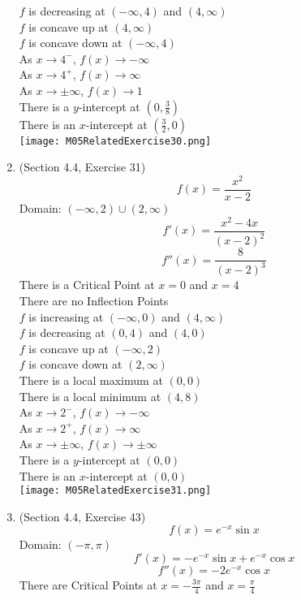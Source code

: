 \documentclass{article}
\begin{document}
\begin{enumerate}
        $f$ is decreasing at $(-\infty, 4)$ and $(4, \infty)$ \\
        $f$ is concave up at $(4, \infty)$ \\
        $f$ is concave down at $(-\infty, 4)$ \\
        As $x \to 4^-$, $f(x) \to -\infty$ \\
        As $x \to 4^+$, $f(x) \to \infty$ \\
        As $x \to \pm \infty$, $f(x) \to 1$ \\
        There is a $y$-intercept at $\left(0, \frac{3}{8}\right)$ \\
        There is an $x$-intercept at $\left(\frac{3}{2}, 0\right)$ \\
        \texttt{[image: M05RelatedExercise30.png]}
    \item (Section 4.4, Exercise 31)
        $$f(x) = \frac{x^2}{x - 2}$$
        Domain: $(-\infty, 2)\cup(2, \infty)$
        $$f'(x) = \frac{x^2 - 4x}{\left(x - 2\right)^2}$$
        $$f''(x) = \frac{8}{\left(x-2\right)^{3}}$$
        There is a Critical Point at $x = 0$ and $x = 4$ \\
        There are no Inflection Points \\
        $f$ is increasing at $(-\infty, 0)$ and $(4, \infty)$ \\
        $f$ is decreasing at $(0, 4)$ and $(4, 0)$ \\
        $f$ is concave up at $(-\infty, 2)$ \\
        $f$ is concave down at $(2, \infty)$ \\
        There is a local maximum at $(0, 0)$ \\
        There is a local minimum at $(4, 8)$ \\
        As $x \to 2^-$, $f(x) \to -\infty$ \\
        As $x \to 2^+$, $f(x) \to \infty$ \\
        As $x \to \pm \infty$, $f(x) \to \pm \infty$ \\
        There is a $y$-intercept at $(0, 0)$ \\
        There is an $x$-intercept at $(0, 0)$ \\
        \texttt{[image: M05RelatedExercise31.png]}
    \item (Section 4.4, Exercise 43)
        $$f(x) = e^{-x}\sin{x}$$
        Domain: $(-\pi, \pi)$
        $$f'(x) = -e^{-x}\sin{x} + e^{-x}\cos{x}$$
        $$f''(x) = -2e^{-x}\cos{x}$$
        There are Critical Points at $x = -\frac{3\pi}{4}$ and $x = \frac{\pi}{4}$ \\

\end{enumerate}
\end{document}
